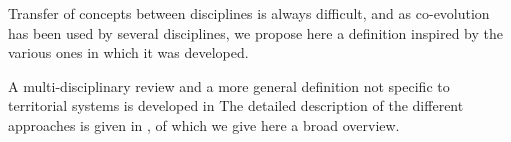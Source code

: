 \documentclass[11pt]{article}
\begin{document}
Transfer of concepts between disciplines is always difficult, and as co-evolution has been used by several disciplines, we propose here a definition inspired by the various ones in which it was developed.

A multi-disciplinary review and a more general definition not specific to territorial systems is developed in %
The detailed description of the different approaches is given in \cite{}, of which we give here a broad overview.
\end{document}

